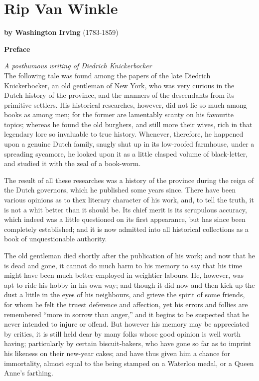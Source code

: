 \chapter{Rip Van Winkle}
\textbf{by Washington Irving} (1783-1859)\\
\begin{center}
	\textbf{Preface}\\
\end{center}

\noindent\textit{A posthumous writing of Diedrich Knickerbocker}\\

\noindent
The following tale was found among the papers of the late Diedrich Knickerbocker, an old gentleman of New York, who was very curious in the Dutch history of the province, and the manners of the descendants from its primitive settlers. His historical researches, however, did not lie so much among books as among men; for the former are lamentably scanty on his favourite topics; whereas he found the old burghers, and still more their wives, rich in that legendary lore so invaluable to true history. Whenever, therefore, he happened upon a genuine Dutch family, snugly shut up in its low-roofed farmhouse, under a spreading sycamore, he looked upon it as a little clasped volume of black-letter, and studied it with the zeal of a book-worm.

The result of all these researches was a history of the province during the reign of the Dutch governors, which he published some years since. There have been various opinions as to thex literary character of his work, and, to tell the truth, it is not a whit better than it should be. Its chief merit is its scrupulous accuracy, which indeed was a little questioned on its first appearance, but has since been completely established; and it is now admitted into all historical collections as a book of unquestionable authority.

The old gentleman died shortly after the publication of his work; and now that he is dead and gone, it cannot do much harm to his memory to say that his time might have been much better employed in weightier labours. He, however, was apt to ride his hobby in his own way; and though it did now and then kick up the dust a little in the eyes of his neighbours, and grieve the spirit of some friends, for whom he felt the truest deference and affection, yet his errors and follies are remembered “more in sorrow than anger,” and it begins to be suspected that he never intended to injure or offend. But however his memory may be appreciated by critics, it is still held dear by many folks whose good opinion is well worth having; particularly by certain biscuit-bakers, who have gone so far as to imprint his likeness on their new-year cakes; and have thus given him a chance for immortality, almost equal to the being stamped on a Waterloo medal, or a Queen Anne’s farthing.

